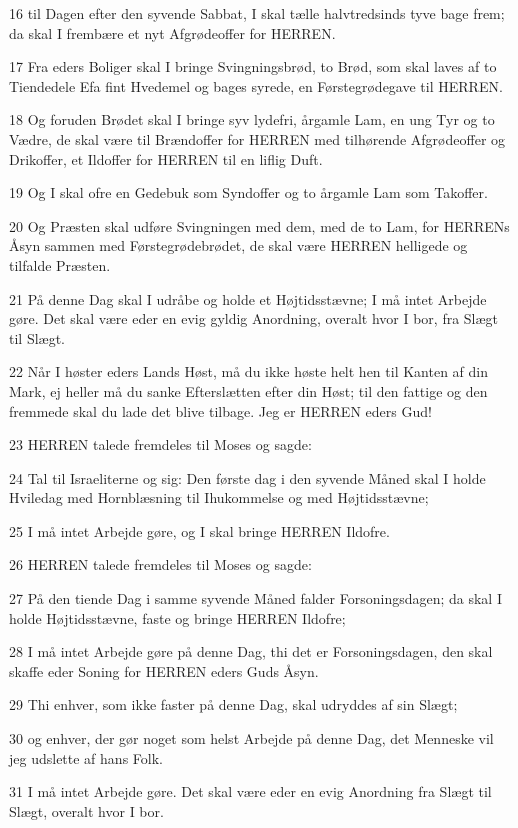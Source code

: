 \par 16 til Dagen efter den syvende Sabbat, I skal tælle halvtredsinds tyve bage frem; da skal I frembære et nyt Afgrødeoffer for HERREN.
\par 17 Fra eders Boliger skal I bringe Svingningsbrød, to Brød, som skal laves af to Tiendedele Efa fint Hvedemel og bages syrede, en Førstegrødegave til HERREN.
\par 18 Og foruden Brødet skal I bringe syv lydefri, årgamle Lam, en ung Tyr og to Vædre, de skal være til Brændoffer for HERREN med tilhørende Afgrødeoffer og Drikoffer, et Ildoffer for HERREN til en liflig Duft.
\par 19 Og I skal ofre en Gedebuk som Syndoffer og to årgamle Lam som Takoffer.
\par 20 Og Præsten skal udføre Svingningen med dem, med de to Lam, for HERRENs Åsyn sammen med Førstegrødebrødet, de skal være HERREN helligede og tilfalde Præsten.
\par 21 På denne Dag skal I udråbe og holde et Højtidsstævne; I må intet Arbejde gøre. Det skal være eder en evig gyldig Anordning, overalt hvor I bor, fra Slægt til Slægt.
\par 22 Når I høster eders Lands Høst, må du ikke høste helt hen til Kanten af din Mark, ej heller må du sanke Efterslætten efter din Høst; til den fattige og den fremmede skal du lade det blive tilbage. Jeg er HERREN eders Gud!
\par 23 HERREN talede fremdeles til Moses og sagde:
\par 24 Tal til Israeliterne og sig: Den første dag i den syvende Måned skal I holde Hviledag med Hornblæsning til Ihukommelse og med Højtidsstævne;
\par 25 I må intet Arbejde gøre, og I skal bringe HERREN Ildofre.
\par 26 HERREN talede fremdeles til Moses og sagde:
\par 27 På den tiende Dag i samme syvende Måned falder Forsoningsdagen; da skal I holde Højtidsstævne, faste og bringe HERREN Ildofre;
\par 28 I må intet Arbejde gøre på denne Dag, thi det er Forsoningsdagen, den skal skaffe eder Soning for HERREN eders Guds Åsyn.
\par 29 Thi enhver, som ikke faster på denne Dag, skal udryddes af sin Slægt;
\par 30 og enhver, der gør noget som helst Arbejde på denne Dag, det Menneske vil jeg udslette af hans Folk.
\par 31 I må intet Arbejde gøre. Det skal være eder en evig Anordning fra Slægt til Slægt, overalt hvor I bor.
